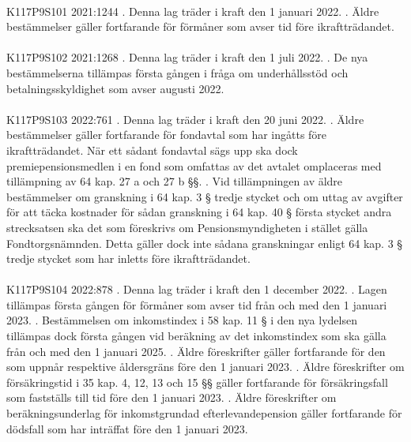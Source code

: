 \documentclass[a4paper,notitlepage,openany,10pt]{book}
\begin{document}
\paragraph*{}
{\tiny K117P9S101}
2021:1244
. Denna lag träder i kraft den 1 januari 2022.
. Äldre bestämmelser gäller fortfarande för förmåner som avser tid före ikraftträdandet.
\paragraph*{}
{\tiny K117P9S102}
2021:1268
. Denna lag träder i kraft den 1 juli 2022.
. De nya bestämmelserna tillämpas första gången i fråga om underhållsstöd och betalningsskyldighet som avser augusti 2022.
\paragraph*{}
{\tiny K117P9S103}
2022:761
. Denna lag träder i kraft den 20 juni 2022.
. Äldre bestämmelser gäller fortfarande för fondavtal som har ingåtts före ikraftträdandet. När ett sådant fondavtal sägs upp ska dock premiepensionsmedlen i en fond som omfattas av det avtalet omplaceras med tillämpning av 64 kap. 27 a och 27 b §§.
. Vid tillämpningen av äldre bestämmelser om granskning i 64 kap. 3 § tredje stycket och om uttag av avgifter för att täcka kostnader för sådan granskning i 64 kap. 40 § första stycket andra strecksatsen ska det som föreskrivs om Pensionsmyndigheten i stället gälla Fondtorgsnämnden. Detta gäller dock inte sådana granskningar enligt 64 kap. 3 § tredje stycket som har inletts före ikraftträdandet.
\paragraph*{}
{\tiny K117P9S104}
2022:878
. Denna lag träder i kraft den 1 december 2022.
. Lagen tillämpas första gången för förmåner som avser tid från och med den 1 januari 2023.
. Bestämmelsen om inkomstindex i 58 kap. 11 § i den nya lydelsen tillämpas dock första gången vid beräkning av det inkomstindex som ska gälla från och med den 1 januari 2025.
. Äldre föreskrifter gäller fortfarande för den som uppnår respektive åldersgräns före den 1 januari 2023.
. Äldre föreskrifter om försäkringstid i 35 kap. 4, 12, 13 och 15 §§ gäller fortfarande för försäkringsfall som fastställs till tid före den 1 januari 2023.
. Äldre föreskrifter om beräkningsunderlag för inkomstgrundad efterlevandepension gäller fortfarande för dödsfall som har inträffat före den 1 januari 2023.
\end{document}
